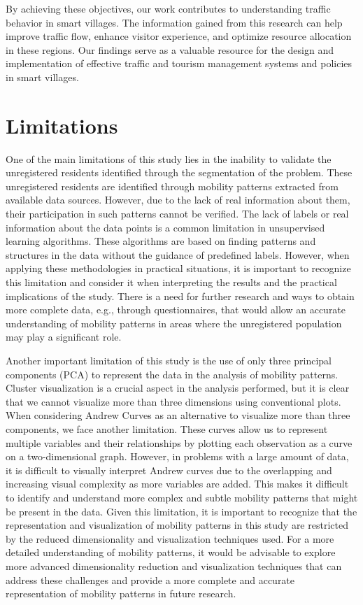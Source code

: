 By achieving these objectives, our work contributes to understanding traffic behavior in smart villages. The information gained from this research can help improve traffic flow, enhance visitor experience, and optimize resource allocation in these regions. Our findings serve as a valuable resource for the design and implementation of effective traffic and tourism management systems and policies in smart villages.

\section{Limitations}

One of the main limitations of this study lies in the inability to validate the unregistered residents identified through the segmentation of the problem. These unregistered residents are identified through mobility patterns extracted from available data sources. However, due to the lack of real information about them, their participation in such patterns cannot be verified. The lack of labels or real information about the data points is a common limitation in unsupervised learning algorithms. These algorithms are based on finding patterns and structures in the data without the guidance of predefined labels. However, when applying these methodologies in practical situations, it is important to recognize this limitation and consider it when interpreting the results and the practical implications of the study. There is a need for further research and ways to obtain more complete data, e.g., through questionnaires, that would allow an accurate understanding of mobility patterns in areas where the unregistered population may play a significant role.

Another important limitation of this study is the use of only three principal components (PCA) to represent the data in the analysis of mobility patterns. Cluster visualization is a crucial aspect in the analysis performed, but it is clear that we cannot visualize more than three dimensions using conventional plots. When considering Andrew Curves as an alternative to visualize more than three components, we face another limitation. These curves allow us to represent multiple variables and their relationships by plotting each observation as a curve on a two-dimensional graph. However, in problems with a large amount of data, it is difficult to visually interpret Andrew curves due to the overlapping and increasing visual complexity as more variables are added. This makes it difficult to identify and understand more complex and subtle mobility patterns that might be present in the data. Given this limitation, it is important to recognize that the representation and visualization of mobility patterns in this study are restricted by the reduced dimensionality and visualization techniques used. For a more detailed understanding of mobility patterns, it would be advisable to explore more advanced dimensionality reduction and visualization techniques that can address these challenges and provide a more complete and accurate representation of mobility patterns in future research.

